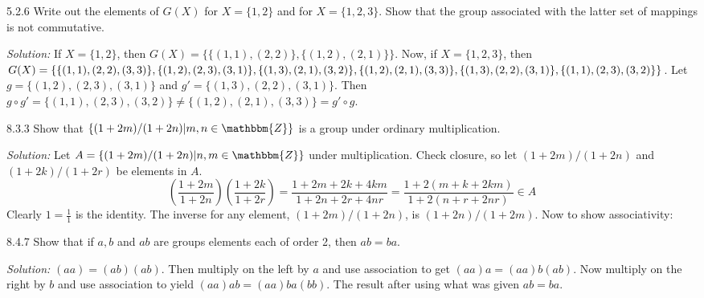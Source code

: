 \documentclass{letter}
\newcommand{\tmem}[1]{{\em #1\/}}
\begin{document}
5.2.6 Write out the elements of $G (X)$ for $X =\{1, 2\}$ and for $X =\{1, 2,
3\}$. Show that the group associated with the latter set of mappings is not
commutative.

{\tmem{Solution:}} If $X =\{1, 2\}$, then $G (X) =\{\{(1, 1), (2, 2)\}, \{(1,
2), (2, 1)\}\}$. Now, if $X =\{1, 2, 3\}$, then $G (X) =\{\{(1, 1), (2, 2),
(3, 3)\}, \{(1, 2), (2, 3), (3, 1)\}, \{(1, 3), (2, 1), (3, 2)\}, \{(1, 2), 
(2, 1), (3, 3)\}, \{(1, 3), (2, 2), (3, 1)\}, \\
\{(1, 1), (2, 3), (3, 2)\}\}$.
Let $g =\{(1, 2), (2, 3), (3, 1)\}$ and $g' =\{(1, 3), (2, 2), (3, 1)\}$. Then
$g \circ g' =\{(1, 1), (2, 3), (3, 2)\} \neq \{(1, 2), (2, 1), (3, 3)\}= g'
\circ g$.

8.3.3 Show that $\{(1 + 2 m) / (1 + 2 n) | m, n \in \mathbbm{Z}\}$ is a group
under ordinary multiplication.

{\tmem{Solution:}} Let $A =\{(1 + 2 m) / (1 + 2 n) | n, m \in \mathbbm{Z}\}$
under multiplication. Check closure, so let $(1 + 2 m) / (1 + 2 n)$ and $(1 +
2 k) / (1 + 2 r)$ be elements in $A$.
\[ ( \frac{1 + 2 m}{1 + 2 n}) ( \frac{1 + 2 k}{1 + 2 r}) = \frac{1 + 2 m + 2 k
   + 4 k m}{1 + 2 n + 2 r + 4 n r} = \frac{1 + 2 (m + k + 2 k m)}{1 + 2 (n + r
   + 2 n r)} \in A \]
Clearly $1 = \frac{1}{1}$ is the identity. The inverse for any element, $(1 +
2 m) / (1 + 2 n)$, is $(1 + 2 n) / (1 + 2 m)$. Now to show associativity:

8.4.7 Show that if $a, b$ and $a b$ are groups elements each of order 2, then
$a b = b a$.

{\tmem{Solution:}} $(a a) = (a b) (a b)$. Then multiply on the left by $a$
and use association to get $(a a) a = (a a) b (a b)$. Now multiply on the
right by $b$ and use association to yield $(a a) a b = (a a) b a (b b)$. The
result after using what was given $a b = b a$.
\end{document}
